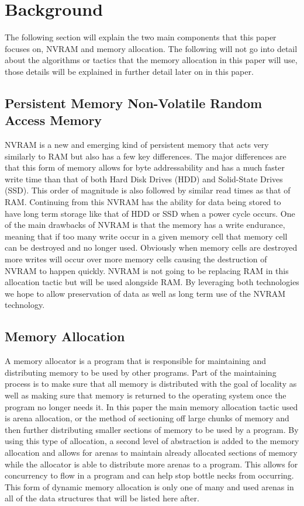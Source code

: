 \documentclass[conference]{IEEEtran}
\begin{document}
\section{Background}
The following section will explain the two main components that this paper focuses on, NVRAM and memory allocation. The following will not go into detail about the algorithms or tactics that the memory allocation in this paper will use, those details will be explained in further detail later on in this paper. 
\subsection{Persistent Memory Non-Volatile Random Access Memory}
NVRAM is a new and emerging kind of persistent memory that acts very similarly to RAM but also has a few key differences. The major differences are that this form of memory allows for byte addressability and has a much faster write time than that of both Hard Disk Drives (HDD) and Solid-State Drives (SSD). This order of magnitude is also followed by similar read times as that of RAM. Continuing from this NVRAM has the ability for data being stored to have long term storage like that of HDD or SSD when a power cycle occurs. One of the main drawbacks of NVRAM is that the memory has a write endurance, meaning that if too many write occur in a given memory cell that memory cell can be destroyed and no longer used. Obviously when memory cells are destroyed more writes will occur over more memory cells causing the destruction of NVRAM to happen quickly. NVRAM is not going to be replacing RAM in this allocation tactic but will be used alongside RAM. By leveraging both technologies we hope to allow preservation of data as well as long term use of the NVRAM technology.
\subsection{Memory Allocation}
A memory allocator is a program that is responsible for maintaining and distributing memory to be used by other programs. Part of the maintaining process is to make sure that all memory is distributed with the goal of locality as well as making sure that memory is returned to the operating system once the program no longer needs it. In this paper the main memory allocation tactic used is arena allocation, or the method of sectioning off large chunks of memory and then further distributing smaller sections of memory to be used by a program. By using this type of allocation, a second level of abstraction is added to the memory allocation and allows for arenas to maintain already allocated sections of memory while the allocator is able to distribute more arenas to a program. This allows for concurrency to flow in a program and can help stop bottle necks from occurring. This form of dynamic memory allocation is only one of many and used arenas in all of the data structures that will be listed here after. 
\end{document}
